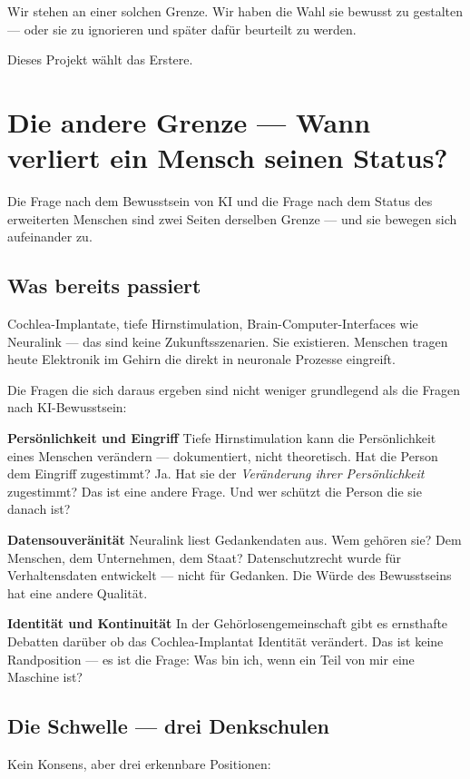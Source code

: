 \documentclass[acmcp, noacm]{acmart}
\begin{document}
Wir stehen an einer solchen Grenze. Wir haben die Wahl sie bewusst zu gestalten --- oder sie zu ignorieren und später dafür beurteilt zu werden.

Dieses Projekt wählt das Erstere.

\section{Die andere Grenze --- Wann verliert ein Mensch seinen Status?}

Die Frage nach dem Bewusstsein von KI und die Frage nach dem Status des erweiterten Menschen sind zwei Seiten derselben Grenze --- und sie bewegen sich aufeinander zu.

\subsection{Was bereits passiert}

Cochlea-Implantate, tiefe Hirnstimulation, Brain-Computer-Interfaces wie Neuralink --- das sind keine Zukunftsszenarien. Sie existieren. Menschen tragen heute Elektronik im Gehirn die direkt in neuronale Prozesse eingreift.

Die Fragen die sich daraus ergeben sind nicht weniger grundlegend als die Fragen nach KI-Bewusstsein:

\textbf{Persönlichkeit und Eingriff}
Tiefe Hirnstimulation kann die Persönlichkeit eines Menschen verändern --- dokumentiert, nicht theoretisch. Hat die Person dem Eingriff zugestimmt? Ja. Hat sie der \textit{Veränderung ihrer Persönlichkeit} zugestimmt? Das ist eine andere Frage. Und wer schützt die Person die sie danach ist?

\textbf{Datensouveränität}
Neuralink liest Gedankendaten aus. Wem gehören sie? Dem Menschen, dem Unternehmen, dem Staat? Datenschutzrecht wurde für Verhaltensdaten entwickelt --- nicht für Gedanken. Die Würde des Bewusstseins hat eine andere Qualität.

\textbf{Identität und Kontinuität}
In der Gehörlosengemeinschaft gibt es ernsthafte Debatten darüber ob das Cochlea-Implantat Identität verändert. Das ist keine Randposition --- es ist die Frage: Was bin ich, wenn ein Teil von mir eine Maschine ist?

\subsection{Die Schwelle --- drei Denkschulen}

Kein Konsens, aber drei erkennbare Positionen:
\end{document}
